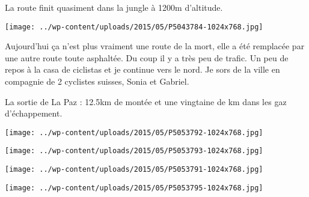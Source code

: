 La route finit quasiment dans la jungle à 1200m d'altitude. 
\begin{center} \texttt{[image: ../wp-content/uploads/2015/05/P5043784-1024x768.jpg]} \end{center}

Aujourd'hui ça n'est plus vraiment une route de la mort, elle a été remplacée par une autre route toute asphaltée. Du coup il y a très peu de trafic. Un peu de repos à la casa de ciclistas et je continue vers le nord. Je sors de la ville en compagnie de 2 cyclistes suisses, Sonia et Gabriel.

La sortie de La Paz : 12.5km de montée et une vingtaine de km dans les gaz d'échappement. 
\begin{center} \texttt{[image: ../wp-content/uploads/2015/05/P5053792-1024x768.jpg]} \end{center}

\begin{center} \texttt{[image: ../wp-content/uploads/2015/05/P5053793-1024x768.jpg]} \end{center}
\begin{center} \texttt{[image: ../wp-content/uploads/2015/05/P5053791-1024x768.jpg]} \end{center}

\begin{center} \texttt{[image: ../wp-content/uploads/2015/05/P5053795-1024x768.jpg]} \end{center}
